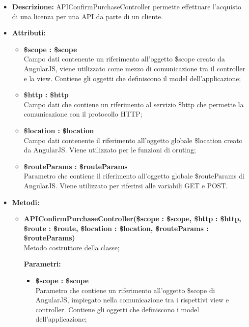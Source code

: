 \begin{itemize}
	\item \textbf{Descrizione:} APIConfirmPurchaseController permette effettuare l'acquisto di una licenza per una API da parte di un cliente.
	\item \textbf{Attributi:}
	\begin{itemize}
		
		\item \textbf{\$scope : \$scope}\\
		Campo dati contenente un riferimento all'oggetto \$scope creato da AngularJS, viene utilizzato come mezzo di comunicazione tra il controller e la view. Contiene gli oggetti che definiscono il model dell'applicazione;
		
		\item \textbf{\$http : \$http }\\
		Campo dati che contiene un riferimento al servizio \$http che permette la comunicazione con il protocollo HTTP;
		
		\item \textbf{\$location : \$location }\\
		Campo dati contenente il riferimento all'oggetto globale \$location creato da AngularJS. Viene utilizzato per le funzioni di oruting;
		
		\item \textbf{\$routeParams : \$routeParams}\\
		Parametro che contiene il riferimento all'oggetto globale \$routeParams di AngularJS. Viene utilizzato per riferirsi alle variabili GET e POST.
		
		
	\end{itemize}
	\item \textbf{Metodi:}
	\begin{itemize}
		
		\item \textbf{APIConfirmPurchaseController(\$scope : \$scope, \$http : \$http, \$route : \$route, \$location : \$location, \$routeParams : \$routeParams)}\\
		Metodo costruttore della classe;
		\begin{description}
			\item[\textbf{Parametri:}]
		\end{description}
		\begin{itemize}
			\item \textbf{\$scope : \$scope}\\
			Parametro che contiene un riferimento all'oggetto \$scope di AngularJS, impiegato nella comunicazione tra i rispettivi view e controller. Contiene gli oggetti che definiscono i model dell'applicazione;
			

\end{itemize}
\end{itemize}
\end{itemize}
